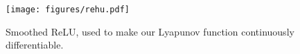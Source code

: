 \begin{figure}
\centering
\texttt{[image: figures/rehu.pdf]}
\caption{Smoothed ReLU, used to make our Lyapunov function continuously differentiable.}
\label{fig:rehu}
\end{figure}
